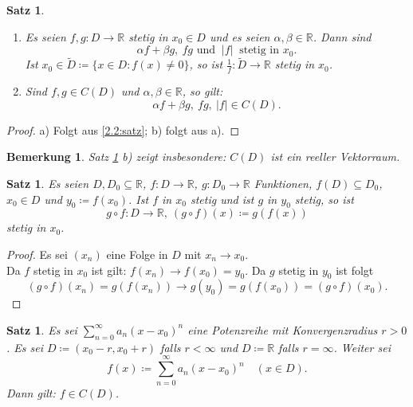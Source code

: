 \documentclass[12pt]{extreport} %
\newcommand{\R}{\mathbb{R}}
\theoremstyle{named}
\theoremstyle{itshape}
\newtheorem{satz}[unnamedtheorem]{Satz}
\theoremstyle{normal}
\newtheorem*{bemerkung}{Bemerkung}
\begin{document}
\begin{satz} ~\ \label{7.2:satz} 
	\begin{enumerate}
		\item Es seien $f, g \colon D \rightarrow \R$ stetig in $x_{0} \in D$ und es seien $\alpha, \beta \in \R$. Dann sind 
			$$ \alpha f + \beta g, ~ fg \text{ und }  ~ |f| ~ \text{ stetig in } x_0. $$
			Ist $x_{0} \in \tilde{D} \coloneqq \{ x \in D : f(x) \neq 0 \}$, so ist $\frac{1}{f} \colon \tilde{D} \rightarrow \R$ stetig in $x_{0}$.
		\item Sind $f, g \in C(D)$ und $\alpha, \beta \in \R$, so gilt:
			$$ \alpha f + \beta g, ~ fg, ~ |f| \in C(D).$$
	\end{enumerate}
\end{satz}



\begin{proof} a) Folgt aus \ref{2.2:satz}; b) folgt aus a). \end{proof}


\begin{bemerkung}
Satz \ref {7.2:satz} b) zeigt insbesondere: $C(D)$ ist ein reeller Vektorraum.
\end{bemerkung}


\begin{satz} \label{7.3:satz}
	Es seien $D, D_{0} \subseteq \R$, $f \colon D \rightarrow \R$, $g \colon D_{0} \rightarrow \R$ Funktionen, $f(D) \subseteq D_{0}$, $x_{0} \in D$ und 
	                $y_{0} \coloneqq f(x_{0})$. Ist $f$ in $x_{0}$ stetig und ist $g$ in $y_{0}$ stetig, so ist
			$$ g \circ f \colon D \rightarrow \R, ~ (g \circ f)(x) \coloneqq g(f(x)) $$
		        stetig in $x_{0}$.
\end{satz}

\begin{proof}
	Es sei $(x_{n})$ eine Folge in $D$ mit $x_{n} \rightarrow x_{0}$. \\
	Da $f$ stetig in $x_{0}$ ist gilt: $f(x_{n}) \rightarrow f(x_{0}) = y_{0}$. Da $g$ stetig in $y_{0}$ ist folgt 
	$$
	(g \circ f)(x_{n}) = g(f(x_{n}))  \rightarrow g(y_{0}) = g(f(x_{0})) = (g \circ f)(x_{0}).
	$$
\end{proof}


\begin{satz} \label{7.4:satz}
	Es sei $\sum_{n=0}^{\infty} a_{n} (x - x_{0})^{n}$ eine Potenzreihe mit Konvergenzradius $r > 0$. Es sei $D \coloneqq (x_{0} - r, x_{0} + r)$ falls $r < \infty$ und 
	$D \coloneqq \R$ falls $r = \infty$. Weiter sei
		$$ f(x) \coloneqq \sum_{n=0}^{\infty} a_{n} (x - x_{0})^{n} \quad (x \in D). $$
	Dann gilt: $f \in C(D)$.	
\end{satz}
\end{document}
